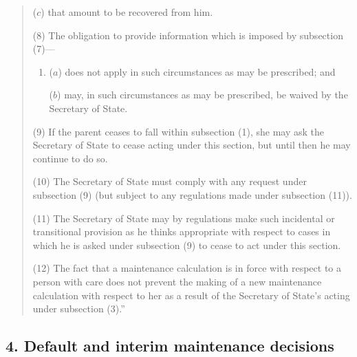 \documentclass[12pt,a4paper]{article}
\begin{document}
\begin{quotation}
\begin{enumerate}
($c$) that amount to be recovered from him.
\end{enumerate}

(8) The obligation to provide information which is imposed by subsection (7)—
\begin{enumerate}\item[]
($a$) does not apply in such circumstances as may be prescribed; and

($b$) may, in such circumstances as may be prescribed, be waived by the Secretary of State.
\end{enumerate}

(9) If the parent ceases to fall within subsection (1), she may ask the Secretary of State to cease acting under this section, but until then he may continue to do so.

(10) The Secretary of State must comply with any request under subsection (9)  (but subject to any regulations made under subsection (11)).

(11) The Secretary of State may by regulations make such incidental or transitional provision as he thinks appropriate with respect to cases in which he is asked under subsection (9)  to cease to act under this section.

(12) The fact that a maintenance calculation is in force with respect to a person with care does not prevent the making of a new maintenance calculation with respect to her as a result of the Secretary of State’s acting under subsection (3).”
\end{quotation}


\subsection{4. Default and interim maintenance decisions}
\end{document}
